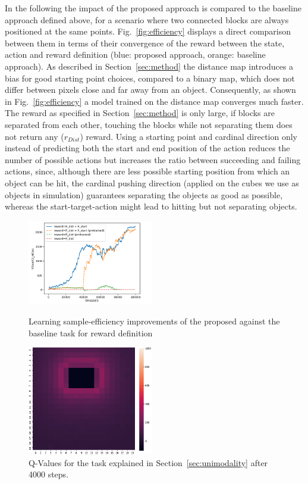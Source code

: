 \documentclass{article}
\newcommand{\myfigref}[1]{Fig.~\ref{#1}}
\newcommand{\mysecref}[1]{Section~\ref{#1}}
\begin{document}
In the following the impact of the proposed approach is compared to the baseline approach defined above, for a scenario where two connected blocks are always positioned at the same points. \myfigref{fig:efficiency} displays a direct comparison between them in terms of their convergence of the reward between the state, action and reward definition (blue: proposed approach, orange: baseline approach).  
\newline
As described in \mysecref{sec:method} the distance map introduces a bias for good starting point choices, compared to a binary map, which does not differ between pixels close and far away from an object. Consequently, as shown in \myfigref{fig:efficiency} a model trained on the distance map converges much faster. The reward as specified in \mysecref{sec:method} is only large, if blocks are separated from each other, touching the blocks while not separating them does not return any ($r_{Dist}$) reward. Using a starting point and cardinal direction only instead of predicting both the start and end position of the action reduces the number of possible actions but increases the ratio between succeeding and failing actions, since, although there are less possible starting position from which an object can be hit, the cardinal pushing direction (applied on the cubes we use as objects in simulation) guarantees separating the objects as good as possible, whereas the start-target-action might lead to hitting but not separating objects. 

\begin{figure}
\centering
\includegraphics[width=5.5cm]{figures/efficiency-reward.png}
\caption{Learning sample-efficiency improvements of the proposed against the baseline task for reward definition} 
\label{fig:rdiffdist}
\includegraphics[width=5.5cm]{figures/q_values_quad.png}
\caption{Q-Values for the task explained in \mysecref{sec:unimodality} after 4000 steps.}
\label{fig:qvalues}
\end{figure}
\end{document}
